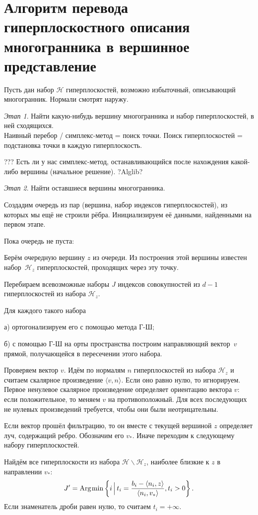 \documentclass[a4paper,12pt]{article}
\newcommand{\scalprod}[3][]{#1\langle #2, #3 #1\rangle} %
\DeclareMathOperator{\Argmin}{Arg\.min}
\renewcommand{\.}{\hspace{0.2ex}}
\begin{document}
\section{Алгоритм перевода гиперплоскостного описания многогранника в вершинное представление}

  Пусть дан набор $\mathcal{H}$ гиперплоскостей, возможно избыточный, описывающий многогранник. Нормали смотрят наружу.

  \textit{Этап 1}. Найти какую-нибудь вершину многогранника и набор гиперплоскостей, в ней сходящихся. \\
  Наивный перебор / симплекс-метод = поиск точки. Поиск гиперплоскостей = подстановка точки в каждую гиперплоскость.

  ??? Есть ли у нас симплекс-метод, останавливающийся после нахождения какой-либо вершины (начальное решение). ?Alglib?

  \textit{Этап 2}. Найти оставшиеся вершины многогранника.

  Создадим очередь из пар (вершина, набор индексов гиперплоскостей), из которых мы ещё не строили рёбра. Инициализируем её данными, найденными на первом этапе.

  Пока очередь не пуста:

  Берём очередную вершину $z$ из очереди. Из построения этой вершины известен набор~$\mathcal{H}_z$ гиперплоскостей, проходящих через эту точку.

  Перебираем всевозможные наборы $J$ индексов совокупностей из $d-1$ гиперплоскостей из набора $\mathcal{H}_z$.

  Для каждого такого набора

  а) ортогонализируем его с помощью метода Г-Ш;

  б) с помощью Г-Ш на орты пространства построим направляющий вектор~$v$ прямой, получающейся в пересечении этого набора.

  Проверяем вектор $v$. Идём по нормалям $n$ гиперплоскостей из набора $\mathcal{H}_z$ и считаем скалярное произведение $\scalprod{v}{n}$. Если оно равно нулю, то игнорируем. Первое ненулевое скалярное произведение определяет ориентацию вектора $v$: если положительное, то меняем $v$ на противоположный. Для всех последующих не нулевых произведений требуется, чтобы они были неотрицательны.

  Если вектор прошёл фильтрацию, то он вместе с текущей вершиной $z$ определяет луч, содержащий ребро. Обозначим его $v_*$. Иначе переходим к следующему набору гиперплоскостей.

  Найдём все гиперплоскости из набора $\mathcal{H} \backslash \mathcal{H}_z $, наиболее близкие к $z$ в направлении $v_*$:
  $$
  J' = \Argmin \left\{i \, \Big{|} \, t_i = \frac{b_i - \scalprod{n_i}{z}}{\scalprod{n_i}{v_*}}, t_i > 0\right\}.
  $$
  Если знаменатель дроби равен нулю, то считаем $t_i = +\infty$.
\end{document}
